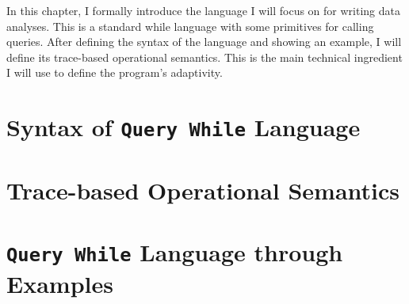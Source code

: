 In this chapter, 
I formally introduce the language I will focus on for writing data analyses.  
This is a standard while language with some primitives for calling queries. 
After defining the syntax of the language and showing an example, 
I will define its trace-based operational semantics. 
This is the main technical ingredient I will use to define the program's adaptivity.
\section{Syntax of {\tt Query While} Language}
\label{sec:language-syntax}

\section{Trace-based Operational Semantics}
\label{sec:language-os}


\section{{\tt Query While} Language through Examples}
\label{sec:language-examples}


